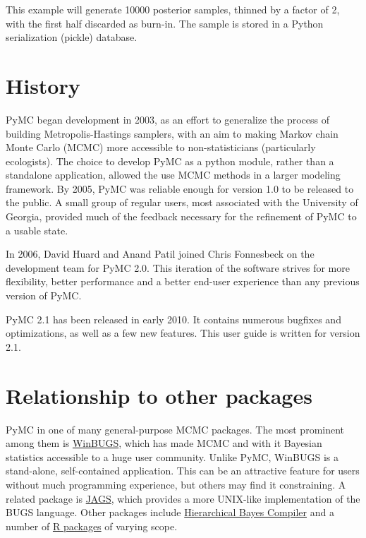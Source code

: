 \documentclass[letterpaper,10pt,english]{sphinxmanual}
\begin{document}
This example will generate 10000 posterior samples, thinned by a factor of 2, with the first half discarded as burn-in. The sample is stored in a Python serialization (pickle) database.


\section{History}
\label{README:history}
PyMC began development in 2003, as an effort to generalize the process of building Metropolis-Hastings samplers, with an aim to making Markov chain Monte Carlo (MCMC) more accessible to non-statisticians (particularly ecologists). The choice to develop PyMC as a python module, rather than a standalone application, allowed the use MCMC methods in a larger modeling framework. By 2005, PyMC was reliable enough for version 1.0 to be released to the public. A small group of regular users, most associated with the University of Georgia, provided much of the feedback necessary for the refinement of PyMC to a usable state.

In 2006, David Huard and Anand Patil joined Chris Fonnesbeck on the development team for PyMC 2.0. This iteration of the software strives for more flexibility, better performance and a better end-user experience than any previous version of PyMC.

PyMC 2.1 has been released in early 2010. It contains numerous bugfixes and optimizations, as well as a few new features. This user guide is written for version 2.1.


\section{Relationship to other packages}
\label{README:relationship-to-other-packages}
PyMC in one of many general-purpose MCMC packages. The most prominent among them is \href{http://www.mrc-bsu.cam.ac.uk/bugs/}{WinBUGS}, which has made MCMC and with it Bayesian statistics accessible to a huge user community. Unlike PyMC, WinBUGS is a stand-alone, self-contained application. This can be an attractive feature for users without much programming experience, but others may find it constraining. A related package is \href{http://www-ice.iarc.fr/~martyn/software/jags/}{JAGS}, which provides a more UNIX-like implementation of the BUGS language. Other packages include \href{http://www.cs.utah.edu/~hal/HBC/}{Hierarchical Bayes Compiler} and a number of \href{http://cran.r-project.org/web/packages/}{R packages} of varying scope.
\end{document}
